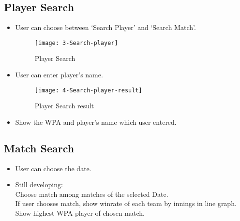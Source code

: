 \documentclass[conference,compsoc, twocolumn]{IEEEtran}
\begin{document}
\subsection{Player Search}

\begin{itemize}
\begin{figure}[H]
\centering\texttt{[image: PlayerSearch-fc]}
\caption{Player Search-flow chart}
\end{figure}


\begin{figure}[H]
\centering\texttt{[image: 2-Search]}
\caption{Search tab}
\end{figure}
\item User can choose between ‘Search Player’ and ‘Search Match’.


\begin{figure}[H]
\centering\texttt{[image: 3-Search-player]}
\caption{Player Search}
\end{figure}
\item User can enter player’s name.


\begin{figure}[H]
\centering\texttt{[image: 4-Search-player-result]}
\caption{Player Search result}
\end{figure}
\item Show the WPA and player’s name which user entered.

\end{itemize}


\subsection{Match Search}

\begin{itemize}
\begin{figure}[H]
\centering\texttt{[image: MatchSearch-fc]}
\caption{Match Search-flow chart}
\end{figure}


\begin{figure}[H]
\centering\texttt{[image: 5-Search-match]}
\caption{match search}
\end{figure}
\item User can choose the date.
\item Still developing: \\
 Choose match among matches of the selected Date.\\
 If user chooses match, show winrate of each team by innings in line graph.\\
 Show highest WPA player of chosen match.

\end{itemize}
\end{document}
